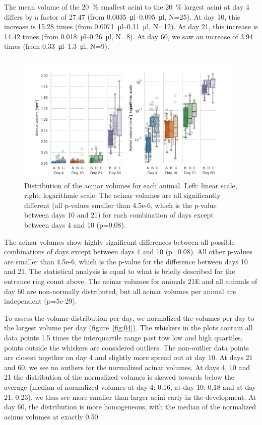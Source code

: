 \documentclass[
  american,
]{article}
\begin{document}
The mean volume of the 20~\% smallest acini to the 20~\% largest acini at day 4 differs by a factor of 27.47 (from 0.0035~μl--0.095~μl, N=25).
At day 10, this increase is 15.28 times (from 0.0071~μl--0.11~μl, N=12).
At day 21, this increase is 14.42 times (from 0.018~μl--0.26~μl, N=8).
At day 60, we saw an increase of 3.94 times (from 0.33~μl--1.3~μl, N=9).

\begin{figure}
\hypertarget{fig:03}{%
\centering
\includegraphics{images/fig03.png}
\caption{Distribution of the acinar volumes for each animal.
Left: linear scale, right: logarithmic scale.
The acinar volumes are all significantly different (all p-values smaller than 4.5e-6, which is the p-value between days 10 and 21) for each combination of days except between days 4 and 10 (p=0.08).}\label{fig:03}
}
\end{figure}

The acinar volumes show highly significant differences between all possible combinations of days except between days 4 and 10 (p=0.08).
All other p-values are smaller than 4.5e-6, which is the p-value for the difference between days 10 and 21.
The statistical analysis is equal to what is briefly described for the entrance ring count above.
The acinar volumes for animals 21E and all animals of day 60 are non-normally distributed, but all acinar volumes per animal are independent (p=5e-29).

To assess the volume distribution per day, we normalized the volumes per day to the largest volume per day (figure~\ref{fig:04}).
The whiskers in the plots contain all data points 1.5 times the interquartile range past tow low and high quartiles, points outside the whiskers are considered outliers.
The non-outlier data points are closest together on day 4 and slightly more spread out at day 10.
At days 21 and 60, we see no outliers for the normalized acinar volumes.
At days 4, 10 and 21 the distribution of the normalized volumes is skewed towards below the average (median of normalized volumes at day 4: 0.16, at day 10: 0.18 and at day 21: 0.23), we thus see more smaller than larger acini early in the development.
At day 60, the distribution is more homogeneous, with the median of the normalized acinus volumes at exactly 0.50.
\end{document}
